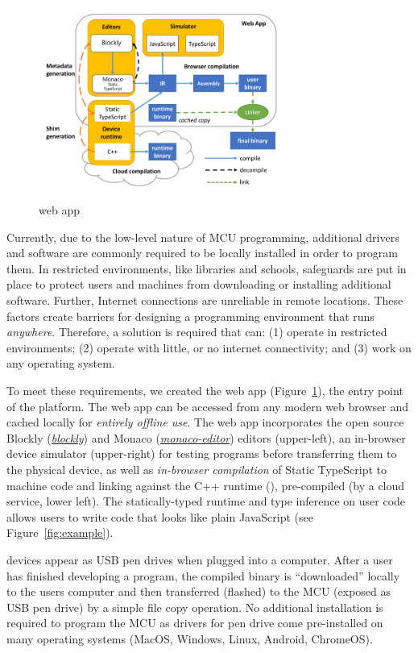 \begin{figure}[t]
    \includegraphics[width=4.8in]{makecodeFig.pdf}
\caption{\label{fig:makecode}\MC web app}
\end{figure}

Currently, due to the low-level nature of MCU programming, additional drivers and software are commonly required to be locally installed in order to program them. In restricted environments, like libraries and schools, safeguards are put in place to protect users and machines from downloading or installing additional software. Further, Internet connections are unreliable in remote locations. These factors create barriers for designing a programming environment that runs \emph{anywhere}. Therefore, a solution is required that can: (1) operate in restricted environments; (2) operate with little, or no internet connectivity; and (3) work on any operating system.

To meet these requirements, we created the \MC web app (Figure~\ref{fig:makecode}), the entry point of the platform. The web app can be accessed from any modern web browser and cached locally for \emph{entirely offline use}. The \MC web app incorporates the open source Blockly (\emph{\href{https://github.com/google/blockly}{blockly}}) and Monaco (\emph{\href{https://github.com/Microsoft/monaco-editor}{monaco-editor}}) editors (upper-left), an in-browser device simulator (upper-right) for testing programs before transferring them to the physical device, as well as \emph{in-browser compilation} of Static TypeScript to machine code and linking against the C++ runtime (\emph{\CON}), pre-compiled (by a cloud service, lower left). The statically-typed runtime and type inference on user code allows users to write code that looks like plain JavaScript (see Figure~\ref{fig:example}).

\MC devices appear as USB pen drives when plugged into a computer. After a user has finished developing a program, the compiled binary is ``downloaded'' locally to the users computer and then transferred (flashed) to the MCU (exposed as USB pen drive) by a simple file copy operation. No additional installation is required to program the MCU as drivers for pen drive come pre-installed on many operating systems (MacOS, Windows, Linux, Android, ChromeOS).

